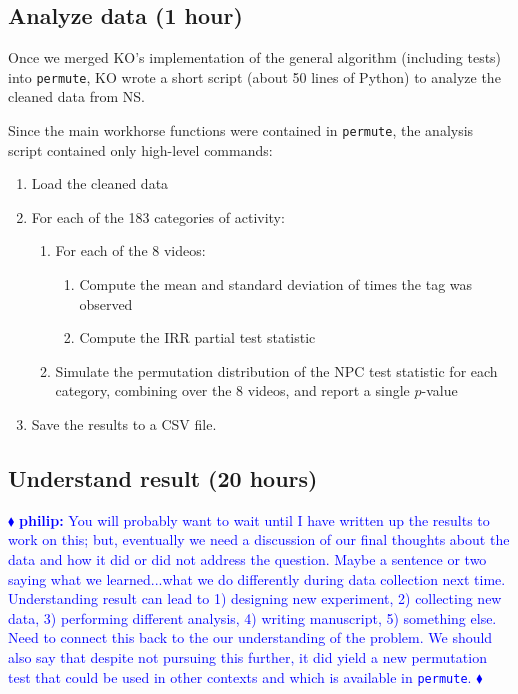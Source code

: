 \documentclass[]{article}
\newcommand{\philip}[1] { \textcolor{blue} {
\ensuremath{\blacklozenge} {\bf philip:}  {#1}
\ensuremath{\blacklozenge} } }
\begin{document}
\subsection{Analyze data (1 hour)}

Once we merged KO's implementation of the general algorithm (including tests)
into \texttt{permute}, KO wrote a short script (about 50 lines of Python) to
analyze the cleaned data from NS.

Since the main workhorse functions were contained in \texttt{permute}, 
the analysis script contained only high-level commands:
\begin{enumerate}
\item Load the cleaned data
\item For each of the 183 categories of activity:
  \begin{enumerate}
    \item For each of the 8 videos:
    \begin{enumerate}
      \item Compute the mean and standard deviation of times the
        tag was observed
      \item Compute the IRR partial test statistic
    \end{enumerate}
    \item Simulate the permutation distribution of the NPC test statistic for each
    category, combining over the $8$ videos, and report a single $p$-value
  \end{enumerate}
\item Save the results to a CSV file.
\end{enumerate}


\subsection{Understand result (20 hours)}\label{subsec:understand-result}

\philip{You will probably want to wait until I have written up the results to
work on this; but, eventually we need a discussion of our final thoughts about
the data and how it did or did not address the question.  Maybe a sentence or
two saying what we learned...what we do differently during data collection next
time.  Understanding result can lead to 1) designing new experiment, 2)
collecting new data, 3) performing different analysis, 4) writing manuscript,
5) something else.  Need to connect this back to the our understanding of the
problem.  We should also say that despite not pursuing this further, it did
yield a new permutation test that could be used in other contexts and which is
available in \texttt{permute}.  }
\end{document}
